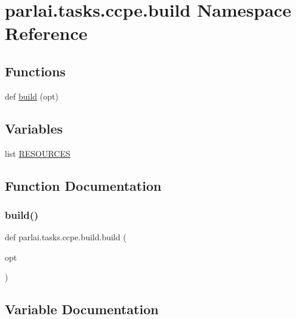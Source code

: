 \hypertarget{namespaceparlai_1_1tasks_1_1ccpe_1_1build}{}\section{parlai.\+tasks.\+ccpe.\+build Namespace Reference}
\label{namespaceparlai_1_1tasks_1_1ccpe_1_1build}
\subsection*{Functions}
\begin{DoxyCompactItemize}
\item 
def \hyperlink{namespaceparlai_1_1tasks_1_1ccpe_1_1build_a3c36666a37a2334071b6372b999d94ca}{build} (opt)
\end{DoxyCompactItemize}
\subsection*{Variables}
\begin{DoxyCompactItemize}
\item 
list \hyperlink{namespaceparlai_1_1tasks_1_1ccpe_1_1build_a5df2747fef648c490cbe2ac949f6648e}{R\+E\+S\+O\+U\+R\+C\+ES}
\end{DoxyCompactItemize}


\subsection{Function Documentation}
\mbox{\label{namespaceparlai_1_1tasks_1_1ccpe_1_1build_a3c36666a37a2334071b6372b999d94ca}} 
\subsubsection{\texorpdfstring{build()}{build()}}
{\footnotesize\ttfamily def parlai.\+tasks.\+ccpe.\+build.\+build (\begin{DoxyParamCaption}\item[{}]{opt }\end{DoxyParamCaption})}



\subsection{Variable Documentation}
\mbox{\label{namespaceparlai_1_1tasks_1_1ccpe_1_1build_a5df2747fef648c490cbe2ac949f6648e}} 
